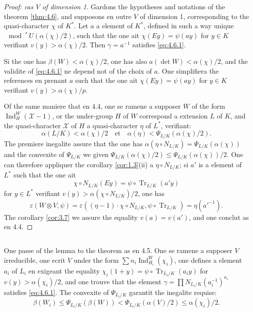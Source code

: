 \documentclass[12pt,a4paper]{article}
\theoremstyle{plain}
\theoremstyle{definition}
\theoremstyle{remark}
\DeclareMathOperator{\Ind}{Ind}
\DeclareMathOperator{\Tr}{Tr}
\newcommand{\cX}{\mathcal{X}}
\providecommand{\cX}{\mathcal{X}}
\providecommand{\Tr}{\operatorname{Tr}}
\begin{document}
\begin{proof}[Proof: cas $V$ of dimension 1]
Gardons the hypotheses and notations of the theorem \ref{thm:4.6}, and supposons en outre $V$ of dimension 1, corresponding to the quasi-character $\chi$ of $K^*$. Let $a$ a element of $K^*$, defined in such a way unique $\mod^*\, U(\alpha(\chi)/2)$, such that the one ait $\chi(Ey) = \psi(ay)$ for $y \in K$ verifiant $v(y) > \alpha(\chi)/2$. Then $\gamma = a^{-1}$ satisfies \eqref{eq:4.6.1}.

Si the one has $\beta(W) < \alpha(\chi)/2$, one has also $a(\det W) < \alpha(\chi)/2$, and the validite of \eqref{eq:4.6.1} ne depend not of the choix of $a$. One simplifiera the references en prenant $a$ such that the one ait $\chi(Ey) = \psi(ay)$ for $y \in K$ verifiant $v(y) > \alpha(\chi)/p$.

Of the same maniere that en 4.4, one se ramene a supposer $W$ of the form $\Ind_H^W(\cX-1)$, or the under-group $H$ of $W$ correspond a extension $L$ of $K$, and the quasi-character $\cX$ of $H$ a quasi-character $\eta$ of $L^*$, verifiant:
\[
\alpha(L/K) < \alpha(\chi)/2 \quad \text{et} \quad \alpha(\eta) < \Psi_{L/K}(\alpha(\chi)/2).
\]
The premiere inegalite assure that the one has $\alpha(\eta \circ N_{L/K}) = \Psi_{L/K}(\alpha(\chi))$ and the convexite of $\Psi_{L/K}$ we given $\Psi_{L/K}(\alpha(\chi)/2) \leq \Psi_{L/K}(\alpha(\chi))/2$. One can therefore appliquer the corollary \ref{cor:1.3}(ii) a $\eta \circ N_{L/K}$; si $a'$ is a element of $L^*$ such that the one ait
\[
\chi \circ N_{L/K}(Ey) = \psi \circ \Tr_{L/K}(a' y)
\]
for $y \in L^*$ verifiant $v(y) > \alpha(\chi \circ N_{L/K})/2$, one has
\[
\varepsilon(W \otimes V, \psi) = \varepsilon((\eta-1) \cdot \chi \circ N_{L/K}, \psi \circ \Tr_{L/K}) = \eta(a'^{-1}).
\]
The corollary \ref{cor:3.7} we assure the equality $v(a) = v(a')$, and one conclut as en 4.4.
\end{proof}

\subsection{}
\label{sec:4.8}

One passe of the lemma to the theorem as en 4.5. One se ramene a supposer $V$ irreducible, one ecrit $V$ under the form $\sum n_i \Ind_{H_i}^W(\chi_i)$, one defines a element $a_i$ of $L_i$ en exigeant the equality $\chi_i(1+y) = \psi \circ \Tr_{L_i/K}(a_i y)$ for $v(y) > \alpha(\chi_i)/2$, and one trouve that the element $\gamma = \prod N_{L_i/K}(a_i^{-1})^{n_i}$ satisfies \eqref{eq:4.6.1}. The convexite of $\Psi_{L_i/K}$ garantit the inegalite requise:
\[
\beta(W_i) \leq \Psi_{L_i/K}(\beta(W)) < \Psi_{L_i/K}(\alpha(V)/2) \leq \alpha(\chi_i)/2.
\]
\end{document}
